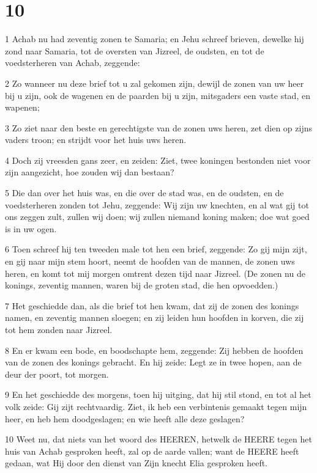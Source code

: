 \chapter{10}

\par 1 Achab nu had zeventig zonen te Samaria; en Jehu schreef brieven, dewelke hij zond naar Samaria, tot de oversten van Jizreel, de oudsten, en tot de voedsterheren van Achab, zeggende:
\par 2 Zo wanneer nu deze brief tot u zal gekomen zijn, dewijl de zonen van uw heer bij u zijn, ook de wagenen en de paarden bij u zijn, mitsgaders een vaste stad, en wapenen;
\par 3 Zo ziet naar den beste en gerechtigste van de zonen uws heren, zet dien op zijns vaders troon; en strijdt voor het huis uws heren.
\par 4 Doch zij vreesden gans zeer, en zeiden: Ziet, twee koningen bestonden niet voor zijn aangezicht, hoe zouden wij dan bestaan?
\par 5 Die dan over het huis was, en die over de stad was, en de oudsten, en de voedsterheren zonden tot Jehu, zeggende: Wij zijn uw knechten, en al wat gij tot ons zeggen zult, zullen wij doen; wij zullen niemand koning maken; doe wat goed is in uw ogen.
\par 6 Toen schreef hij ten tweeden male tot hen een brief, zeggende: Zo gij mijn zijt, en gij naar mijn stem hoort, neemt de hoofden van de mannen, de zonen uws heren, en komt tot mij morgen omtrent dezen tijd naar Jizreel. (De zonen nu de konings, zeventig mannen, waren bij de groten stad, die hen opvoedden.)
\par 7 Het geschiedde dan, als die brief tot hen kwam, dat zij de zonen des konings namen, en zeventig mannen sloegen; en zij leiden hun hoofden in korven, die zij tot hem zonden naar Jizreel.
\par 8 En er kwam een bode, en boodschapte hem, zeggende: Zij hebben de hoofden van de zonen des konings gebracht. En hij zeide: Legt ze in twee hopen, aan de deur der poort, tot morgen.
\par 9 En het geschiedde des morgens, toen hij uitging, dat hij stil stond, en tot al het volk zeide: Gij zijt rechtvaardig. Ziet, ik heb een verbintenis gemaakt tegen mijn heer, en heb hem doodgeslagen; en wie heeft alle deze geslagen?
\par 10 Weet nu, dat niets van het woord des HEEREN, hetwelk de HEERE tegen het huis van Achab gesproken heeft, zal op de aarde vallen; want de HEERE heeft gedaan, wat Hij door den dienst van Zijn knecht Elia gesproken heeft.
